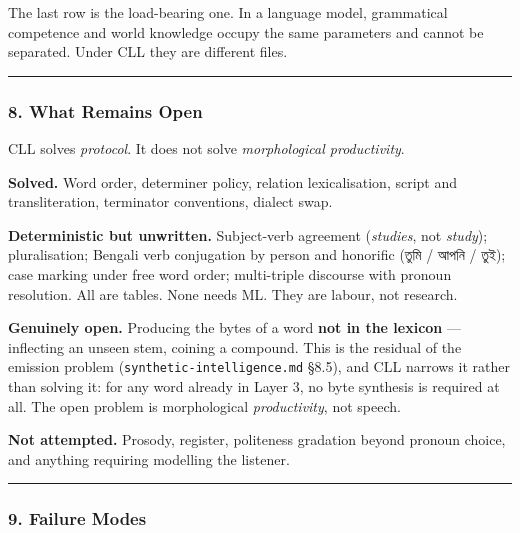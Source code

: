 \documentclass[
  11pt,
  a4paper,
]{article}
\begin{document}
The last row is the load-bearing one. In a language model, grammatical
competence and world knowledge occupy the same parameters and cannot be
separated. Under CLL they are different files.

\begin{center}\rule{0.5\linewidth}{0.5pt}\end{center}

\subsubsection{8. What Remains Open}\label{what-remains-open}

CLL solves \emph{protocol}. It does not solve \emph{morphological
productivity}.

\textbf{Solved.} Word order, determiner policy, relation lexicalisation,
script and transliteration, terminator conventions, dialect swap.

\textbf{Deterministic but unwritten.} Subject-verb agreement
(\emph{studies}, not \emph{study}); pluralisation; Bengali verb
conjugation by person and honorific (তুমি / আপনি / তুই); case marking
under free word order; multi-triple discourse with pronoun resolution.
All are tables. None needs ML. They are labour, not research.

\textbf{Genuinely open.} Producing the bytes of a word \textbf{not in
the lexicon} --- inflecting an unseen stem, coining a compound. This is
the residual of the emission problem (\texttt{synthetic-intelligence.md}
§8.5), and CLL narrows it rather than solving it: for any word already
in Layer 3, no byte synthesis is required at all. The open problem is
morphological \emph{productivity}, not speech.

\textbf{Not attempted.} Prosody, register, politeness gradation beyond
pronoun choice, and anything requiring modelling the listener.

\begin{center}\rule{0.5\linewidth}{0.5pt}\end{center}

\subsubsection{9. Failure Modes}\label{failure-modes}
\end{document}
